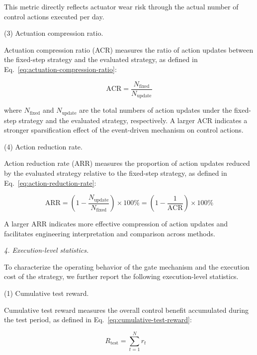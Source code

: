 \documentclass[preprint,12pt,number]{elsarticle}
\begin{document}
This metric directly reflects actuator wear risk through the actual number of control actions executed per day.

\par\smallskip
\noindent (3) Actuation compression ratio.
\par\nobreak Actuation compression ratio (ACR) measures the ratio of action updates between the fixed-step strategy and the evaluated strategy, as defined in Eq.~\eqref{eq:actuation-compression-ratio}:

\[
\mathrm{ACR} = \frac{N_{\text{fixed}}}{N_{\text{update}}} \tag{32}\label{eq:actuation-compression-ratio}
\]

\noindent where \(N_{\text{fixed}}\) and \(N_{\text{update}}\) are the total numbers of action updates under the fixed-step strategy and the evaluated strategy, respectively. A larger ACR indicates a stronger sparsification effect of the event-driven mechanism on control actions.

\par\smallskip
\noindent (4) Action reduction rate.
\par\nobreak Action reduction rate (ARR) measures the proportion of action updates reduced by the evaluated strategy relative to the fixed-step strategy, as defined in Eq.~\eqref{eq:action-reduction-rate}:

\[
\mathrm{ARR}=\left(1-\frac{N_{\text{update}}}{N_{\text{fixed}}}\right)\times 100\% = \left(1-\frac{1}{\mathrm{ACR}}\right)\times 100\% \tag{33}\label{eq:action-reduction-rate}
\]

A larger ARR indicates more effective compression of action updates and facilitates engineering interpretation and comparison across methods.

\par\medskip
\noindent\textit{4. Execution-level statistics.}\label{execution-level-statistics}
\par\smallskip

To characterize the operating behavior of the gate mechanism and the execution cost of the strategy, we further report the following execution-level statistics.

\par\smallskip
\noindent (1) Cumulative test reward.
\par\nobreak Cumulative test reward measures the overall control benefit accumulated during the test period, as defined in Eq.~\eqref{eq:cumulative-test-reward}:

\[
R_{\text{test}} = \sum_{t=1}^{N} r_t \quad \tag{34}\label{eq:cumulative-test-reward}
\]
\end{document}
